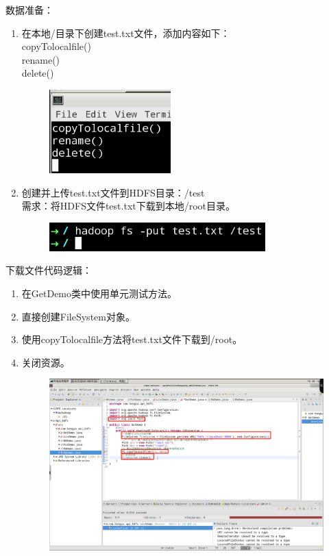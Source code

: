 \documentclass {article}
\begin{document}
				数据准备：	
				\begin{enumerate}
					\item 在本地/目录下创建test.txt文件，添加内容如下：\\
					copyTolocalfile() \\
					rename() \\
					delete()
					
					\begin{figure}[H]
						\centering
						\includegraphics{figures/fig22.png}
					\end{figure}
				
					\item 创建并上传test.txt文件到HDFS目录：/test \\
					需求：将HDFS文件test.txt下载到本地/root目录。
					\begin{figure}[H]
						\centering
						\includegraphics{figures/fig21.5.png}
					\end{figure}
				\end{enumerate}
			
				下载文件代码逻辑：
				\begin{enumerate}
					\item 在GetDemo类中使用单元测试方法。
					\item 直接创建FileSystem对象。
					\item 使用copyTolocalfile方法将test.txt文件下载到/root。
					\item 关闭资源。
					\begin{figure}[H]
						\centering
						\includegraphics[width=4.5in]{figures/fig23.png}
					\end{figure}
				\end{enumerate}
				
\end{document}
